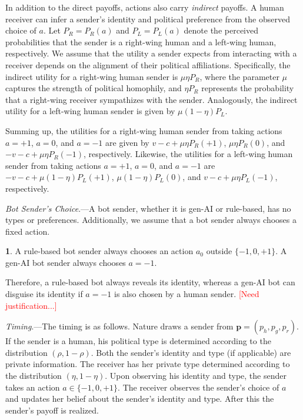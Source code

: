 \documentclass[english,12pt]{article}
\theoremstyle{plain}
\theoremstyle{plain}
\theoremstyle{definition}
\theoremstyle{definition}
\theoremstyle{assumption}
\newtheorem{assumption}{\protect\assumptionname}
\theoremstyle{plain}
\theoremstyle{plain}
\theoremstyle{plain}
\theoremstyle{plain}
\theoremstyle{definition}%
\theoremstyle{plain}
\theoremstyle{plain}
\theoremstyle{plain}
\theoremstyle{plain}
\theoremstyle{plain}
\theoremstyle{plain}
\providecommand{\assumptionname}{Assumption}
\begin{document}
In addition to the direct payoffs, actions also carry \textit{indirect} payoffs. A human receiver can infer a sender's identity and political preference from the observed choice of $a$. Let $P_R=P_R(a)$ and $P_L=P_L(a)$ denote the perceived probabilities that the sender is a right-wing human and a left-wing human, respectively. We assume that the utility a sender expects from interacting with a receiver depends on the alignment of their political affiliations. Specifically, the indirect utility for a right-wing human sender is $\mu\eta P_R$, where the parameter $\mu$ captures the strength of political homophily, and $\eta P_R$ represents the probability that a right-wing receiver sympathizes with the sender. Analogously, the indirect utility for a left-wing human sender is given by $\mu(1-\eta)P_L$. 

Summing up, the utilities for a right-wing human sender from taking actions $a=+1$, $a=0$, and $a=-1$ are given by $v-c+\mu\eta P_R(+1)$, $\mu\eta P_R(0)$, and $-v-c+\mu\eta P_R(-1)$, respectively. Likewise, the utilities for a left-wing human sender from taking actions $a=+1$, $a=0$, and $a=-1$ are $-v-c+\mu(1-\eta) P_L(+1)$, $\mu(1-\eta) P_L(0)$, and $v-c+\mu\eta P_L(-1)$, respectively.


\textit{Bot Sender's Choice}.---A bot sender, whether it is gen-AI or rule-based, has no types or preferences. Additionally, we assume that a bot sender always chooses a fixed action.

\begin{assumption}\label{assumption:bot_action}
    A rule-based bot sender always chooses an action $a_0$ outside $\{-1,0,+1\}$. A gen-AI bot sender always chooses $a=-1$.
\end{assumption}

Therefore, a rule-based bot always reveals its identity, whereas a gen-AI bot can disguise its identity if $a=-1$ is also chosen by a human sender. \textcolor{red}{[Need justification...]}

\textit{Timing}.---The timing is as follows. Nature draws a sender from $\bm{p}=(p_h,p_g,p_r)$. If the sender is a human, his political type is determined according to the distribution $(\rho,1-\rho)$. Both the sender's identity and type (if applicable) are private information. The receiver has her private type determined according to the distribution $(\eta,1-\eta)$. Upon observing his identity and type, the sender takes an action $a\in \{-1,0,+1\}$. The receiver observes the sender's choice of $a$ and updates her belief about the sender's identity and type. After this the sender's payoff is realized.
\end{document}
